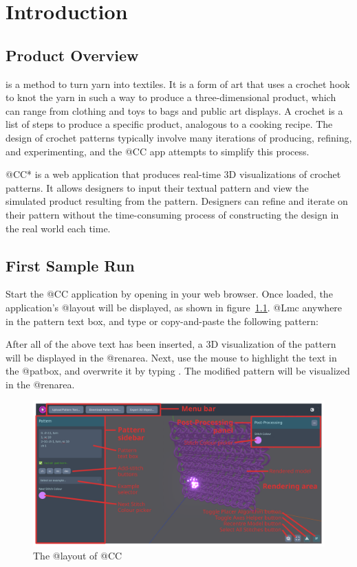 \documentclass[main.tex]{subfiles}
\begin{document}
\chapter{Introduction}\label{chp:introduction}

\section{Product Overview}

 is a method to turn yarn into textiles. It is a form of art that uses a crochet hook to knot the yarn in such a way to produce a three-dimensional product, which can range from clothing and toys to bags and public art displays.
A crochet  is a list of steps to produce a specific product, analogous to a cooking recipe. The design of crochet patterns typically involve many iterations of producing, refining, and experimenting, and the @CC app attempts to simplify this process.

@CC* is a web application that produces real-time 3D visualizations of crochet patterns. It allows designers to input their textual pattern and view the simulated product resulting from the pattern. Designers can refine and iterate on their pattern without the time-consuming process of constructing the design in the real world each time.

\section{First Sample Run}

Start the @CC application by opening \href{https://crochetcraft.jtai.dev}{} in your web browser. Once loaded, the application's @layout will be displayed, as shown in figure~\ref{fig:layout}. @Lmc anywhere in the pattern text box, and type or copy-and-paste the following pattern:


After all of the above text has been inserted, a 3D visualization of the pattern will be displayed in the @renarea.
Next, use the mouse to highlight the text  in the @patbox,
and overwrite it by typing .
The modified pattern will be visualized in the @renarea.

\begin{figure}[htbp]
    \centering
    \includegraphics[width=\linewidth]{layout.png}
    \caption{The @layout of @CC}
    \label{fig:layout}
\end{figure}
\end{document}

